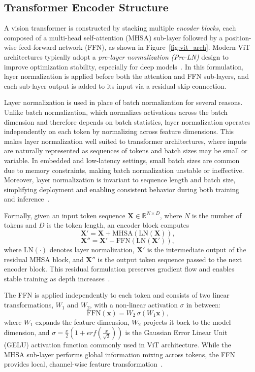 \documentclass[runningheads,a4paper]{llncs}
\begin{document}
\subsection{Transformer Encoder Structure}
A vision transformer is constructed by stacking multiple \emph{encoder blocks}, each composed of a multi-head self-attention (MHSA) sub-layer followed by a position-wise feed-forward network (FFN), as shown in Figure~\ref{fig:vit_arch}. Modern ViT architectures typically adopt a \emph{pre-layer normalization (Pre-LN)} design to improve optimization stability, especially for deep models~\cite{xiong2020preln}. In this formulation, layer normalization is applied before both the attention and FFN sub-layers, and each sub-layer output is added to its input via a residual skip connection.

Layer normalization is used in place of batch normalization for several reasons. Unlike batch normalization, which normalizes activations across the batch dimension and therefore depends on batch statistics, layer normalization operates independently on each token by normalizing across feature dimensions. This makes layer normalization well suited to transformer architectures, where inputs are naturally represented as sequences of tokens and batch sizes may be small or variable. In embedded and low-latency settings, small batch sizes are common due to memory constraints, making batch normalization unstable or ineffective. Moreover, layer normalization is invariant to sequence length and batch size, simplifying deployment and enabling consistent behavior during both training and inference~\cite{ba2016layernorm}.

Formally, given an input token sequence $\mathbf{X} \in \mathbb{R}^{N \times D}$, where $N$ is the number of tokens and $D$ is the token length, an encoder block computes
\[
\mathbf{X}' = \mathbf{X} + \mathrm{MHSA}(\mathrm{LN}(\mathbf{X})),
\]
\[
\mathbf{X}'' = \mathbf{X}' + \mathrm{FFN}(\mathrm{LN}(\mathbf{X}')),
\]
where $\mathrm{LN}(\cdot)$ denotes layer normalization, $\mathbf{X}'$ is the intermediate output of the residual MHSA block, and $\mathbf{X}''$ is the output token sequence passed to the next encoder block. This residual formulation preserves gradient flow and enables stable training as depth increases~\cite{he2016resnet}.

The FFN is applied independently to each token and consists of two linear transformations, $W_1$ and $W_2$, with a non-linear activation $\sigma$ in between:
\[
\mathrm{FFN}(\mathbf{x}) = W_2 \, \sigma(W_1 \mathbf{x}),
\]
where $W_1$ expands the feature dimension, $W_2$ projects it back to the model dimension, and $\sigma=\frac{x}{2}\left( 1 + erf\left(\frac{x}{\sqrt{2}}\right)\right)$ is the Gaussian Error Linear Unit (GELU) activation function commonly used in ViT architecture. While the MHSA sub-layer performs global information mixing across tokens, the FFN provides local, channel-wise feature transformation~\cite{vaswani2017attention}.
\end{document}
